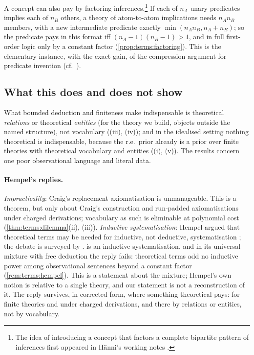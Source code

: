 A concept can also pay by factoring inferences.\footnote{The idea of introducing a concept that factors a complete bipartite pattern of inferences first appeared in H\"anni's working notes \citep{hanni2026notes}.} If each of $n_A$ unary predicates implies each of $n_B$ others, a theory of atom-to-atom implications needs $n_An_B$ members, with a new intermediate predicate exactly $\min(n_An_B,n_A+n_B)$; so the predicate pays in this format iff $(n_A-1)(n_B-1)>1$, and in full first-order logic only by a constant factor (\cref{prop:terms:factoring}). This is the elementary instance, with the exact gain, of the compression argument for predicate invention (cf.\ \citealp{muggleton1988machine}).

\subsection{What this does and does not show}\label{sec:terms:reading}

What bounded deduction and finiteness make indispensable is theoretical \emph{relations} or theoretical \emph{entities} (for the theory we build, objects outside the named structure), not vocabulary ((iii), (iv)); and in the idealised setting nothing theoretical is indispensable, because the r.e.\ prior already is a prior over finite theories with theoretical vocabulary and entities ((i), (v)). The results concern one poor observational language and literal data.

\paragraph{Hempel's replies.}\label{rem:phil:hempel} \emph{Impracticality}: Craig's replacement axiomatisation is unmanageable. This is a theorem, but only about Craig's construction and run-padded axiomatisations under charged derivations; vocabulary as such is eliminable at polynomial cost (\cref{thm:terms:dilemma}(ii), (iii)). \emph{Inductive systematisation}: Hempel argued that theoretical terms may be needed for inductive, not deductive, systematisation \citep{hempel1958theoretician}; the debate is surveyed by \citet{niiniluoto1972inductive}. \SAI is an inductive systematisation, and in its universal mixture with free deduction the reply fails: theoretical terms add no inductive power among observational sentences beyond a constant factor (\cref{rem:terms:hempel}). This is a statement about the mixture; Hempel's own notion is relative to a single theory, and our statement is not a reconstruction of it. The reply survives, in corrected form, where something theoretical pays: for finite theories and under charged derivations, and there by relations or entities, not by vocabulary.
